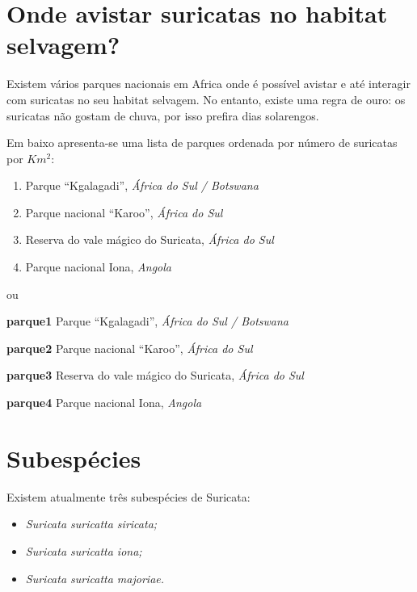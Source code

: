 \documentclass[11pt, a4paper]{report}
\begin{document}
\section{Onde avistar suricatas no habitat selvagem?}
Existem vários parques nacionais em Africa onde é possível avistar e
até interagir com suricatas no seu habitat selvagem. No entanto, existe
uma regra de ouro: os suricatas n\~ao gostam de chuva, por isso prefira
dias solarengos.

Em baixo apresenta-se uma lista de parques ordenada por número de
suricatas por $Km^2$:
\begin{enumerate}
\item Parque “Kgalagadi”, \textit{África do Sul / Botswana}
\item Parque nacional “Karoo”, \textit{África do Sul}
\item Reserva do vale mágico do Suricata, \textit{África do Sul}
\item Parque nacional Iona, \textit{Angola}
\end{enumerate}

ou
\begin{description}
\item \textbf{parque1} Parque “Kgalagadi”, \textit{África do Sul / Botswana}
\item \textbf{parque2} Parque nacional “Karoo”, \textit{África do Sul}
\item \textbf{parque3} Reserva do vale mágico do Suricata, \textit{África do Sul}
\item \textbf{parque4} Parque nacional Iona, \textit{Angola}
\end{description}
\section{Subespécies}
Existem atualmente três subespécies de Suricata:

\begin{itemize}
\item \textit{Suricata suricatta siricata;}
\item \textit{Suricata suricatta iona;}
\item \textit{Suricata suricatta majoriae.}
\end{itemize}
\end{document}
